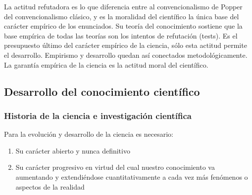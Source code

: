 \documentclass[a4paper, 11pt, twocolumn, spanish]{article}
\begin{document}
La actitud refutadora es lo que diferencia entre al convencionalismo
de Popper del convencionalismo clásico, y es la moralidad del
científico la única base del carácter empírico de los enunciados. Su
teoría del conocimiento sostiene que la base empírica de todas las
teorías son los intentos de refutación (tests). Es el presupuesto
último del carácter empírico de la ciencia, sólo esta actitud permite
el desarrollo. Empirismo y desarrollo quedan así conectados
metodológicamente. La garantía empírica de la ciencia es la actitud
moral del científico.

\subsection{Desarrollo del conocimiento científico}
\label{sec:org1c432e7}

\subsubsection{Historia de la ciencia e investigación científica}
\label{sec:orgd644924}
Para la evolución y desarrollo de la ciencia es necesario:
\begin{enumerate}
\item Su carácter abierto y nunca definitivo
\item Su carácter progresivo en virtud del cual nuestro conocimiento va
aumentando y extendiéndose cuantitativamente a cada vez más
fenómenos o aspectos de la realidad
\end{enumerate}
\end{document}
